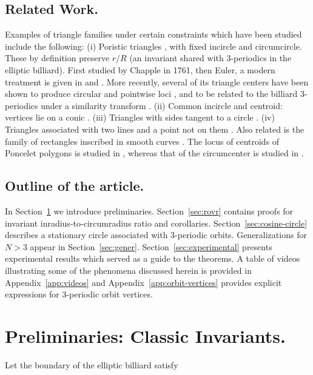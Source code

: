 \documentclass{article}
\theoremstyle{definition}
\begin{document}
\bigskip
\subsection{Related Work.}
Examples of triangle families under certain constraints which have been studied include the following: (i) Poristic triangles \cite{Gallatly1913}, with fixed incircle and circumcircle. These by definition   preserve  $r/R$ (an invariant shared with 3-periodics in the elliptic billiard). First studied by Chapple in 1761, then Euler, a modern treatment is given in \cite{Weaver1924,Weaver1933} and \cite{Murnaghan1925}. More recently, several of its triangle centers have been shown to produce circular and pointwise loci \cite{Odenhal2011}, and to be related to the billiard 3-periodics under a similarity transform \cite{garcia2020-poristics}. (ii) Common incircle and centroid: vertices lie on a conic \cite{Pamfilos2011}. (iii)
Triangles with sides tangent to a circle \cite{Nikolina-families2012}. (iv) Triangles associated with two lines and a point not on them \cite{Sliepcevic2013}. Also related is the family of rectangles inscribed in smooth curves \cite{schwartz2018-rectangles}. The locus of centroids of Poncelet polygons is studied in \cite{schwartz2016-com}, whereas that of the circumcenter is studied in \cite{ana2020}.

\bigskip
\subsection{Outline of the article.} In Section~\ref{sec:prelim} we introduce preliminaries. Section~\ref{sec:rovr} contains proofs for invariant inradius-to-circumradius ratio and corollaries. Section~\ref{sec:cosine-circle} describes a stationary circle associated with 3-periodic orbits. Generalizations for $N>3$ appear in Section~\ref{sec:gener}. Section~\ref{sec:experimental} presents experimental results which served as a guide to the theorems. A table of videos illustrating some of the phenomena discussed herein is provided in Appendix~\ref{app:videos} and Appendix~\ref{app:orbit-vertices} provides explicit expressions for 3-periodic orbit vertices.

\section{Preliminaries: Classic Invariants.}
\label{sec:prelim}
Let the boundary of the elliptic billiard satisfy
\end{document}
